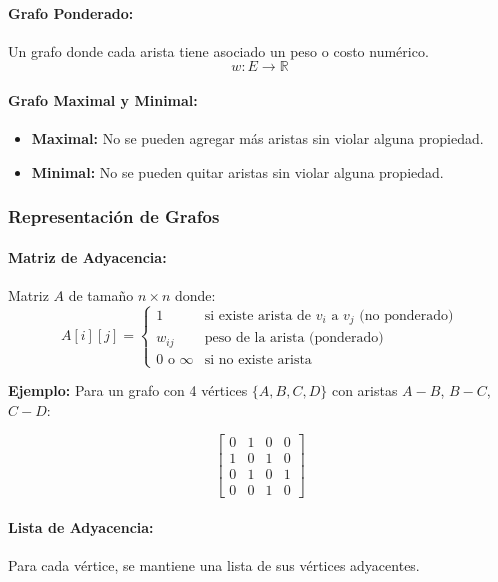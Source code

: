 \documentclass[12pt,a4paper]{article}
\begin{document}
\paragraph{Grafo Ponderado:}
Un grafo donde cada arista tiene asociado un peso o costo numérico.
$$w: E \rightarrow \mathbb{R}$$

\paragraph{Grafo Maximal y Minimal:}
\begin{itemize}
    \item \textbf{Maximal:} No se pueden agregar más aristas sin violar alguna propiedad.
    \item \textbf{Minimal:} No se pueden quitar aristas sin violar alguna propiedad.
\end{itemize}

\subsubsection{Representación de Grafos}

\paragraph{Matriz de Adyacencia:}
Matriz $A$ de tamaño $n \times n$ donde:
$$A[i][j] = \begin{cases} 
1 & \text{si existe arista de } v_i \text{ a } v_j \text{ (no ponderado)} \\
w_{ij} & \text{peso de la arista (ponderado)} \\
0 \text{ o } \infty & \text{si no existe arista}
\end{cases}$$

\textbf{Ejemplo:} Para un grafo con 4 vértices $\{A, B, C, D\}$ con aristas $A-B$, $B-C$, $C-D$:

$$\begin{bmatrix}
0 & 1 & 0 & 0 \\
1 & 0 & 1 & 0 \\
0 & 1 & 0 & 1 \\
0 & 0 & 1 & 0
\end{bmatrix}$$

\paragraph{Lista de Adyacencia:}
Para cada vértice, se mantiene una lista de sus vértices adyacentes.
\end{document}
